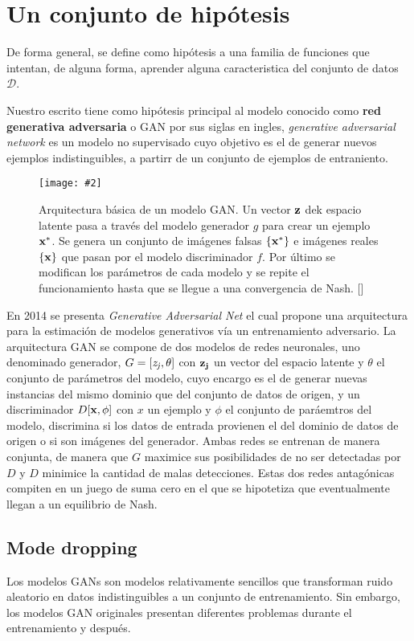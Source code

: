 \documentclass[letterpaper,12pt,oneside]{book}
\newcommand{\figura}[4]{
          \begin{figure}[H]
            \centering
            \texttt{[image: \#2]}
            \caption{#3}
            \label{#4}
          \end{figure}
                            }
\newcommand{\bb}[1]{\{#1\}}
\begin{document}
            \section{Un conjunto de hipótesis}
                De forma general, se define como hipótesis a una familia de funciones que intentan, de alguna forma, aprender alguna caracteristica del conjunto de datos $\mathcal{D}$. 

                Nuestro escrito tiene como hipótesis principal al modelo conocido como {\bf red generativa adversaria }o GAN por sus siglas en ingles, {\it generative adversarial network} es un modelo no supervisado cuyo objetivo es el de generar nuevos ejemplos indistinguibles, a partirr de un conjunto de ejemplos de entraniento.
                
                \figura{0.25}{Imagenes/Resultados/gan_arc}{Arquitectura básica de un modelo GAN. Un vector ${\bf z}$ dek espacio latente pasa a través del modelo generador $g$ para crear un ejemplo ${\bf x^*}$. Se genera un conjunto de imágenes falsas $\bb{{\bf x^*}}$ e imágenes reales $\bb{{\bf x}}$ que pasan por el modelo discriminador $f$. Por último se modifican los parámetros de cada modelo y se repite el funcionamiento hasta que se llegue a una convergencia de Nash. [\cite{prince2023understanding}]}{fig:gan_arc}

                En 2014 se presenta {\it Generative Adversarial Net} el cual propone una arquitectura para la estimación de modelos generativos vía un entrenamiento adversario. 
                La arquitectura GAN se compone de dos modelos de redes neuronales, uno denominado generador, $G = [{\it z_j}, \theta]$ con ${\bf z_j}$ un vector del espacio latente y $\theta$ el conjunto de parámetros del modelo, cuyo encargo es el de generar nuevas instancias del mismo dominio que del conjunto de datos de origen, y un discriminador $D[{\bf x}, \phi]$ con $x$ un ejemplo y $\phi$ el conjunto de paráemtros del modelo, discrimina si los datos de entrada provienen el del dominio de datos de origen o si son imágenes del generador. Ambas redes se entrenan de manera conjunta, de manera que $G$ maximice sus posibilidades de no ser detectadas por $D$ y $D$ minimice la cantidad de malas detecciones. Estas dos redes antagónicas compiten en un juego de suma cero en el que se hipotetiza que eventualmente llegan a un equilibrio de Nash.

                \subsection{Mode dropping}
                    Los modelos GANs son modelos relativamente sencillos que transforman ruido aleatorio en datos indistinguibles a un conjunto de entrenamiento. Sin embargo, los modelos GAN originales presentan diferentes problemas durante el entrenamiento y después. 
\end{document}
